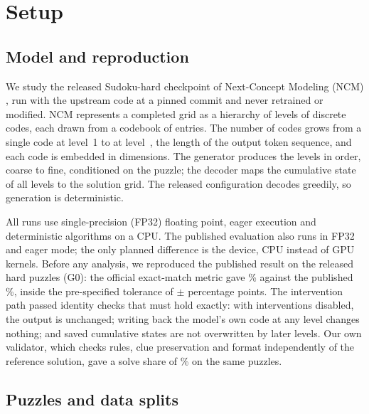 \section{Setup}
\label{sec:setup}

\subsection{Model and reproduction}
\label{sec:setup-model}

We study the released Sudoku-hard checkpoint of Next-Concept Modeling (NCM) \citep{kumbong2026ncm}, run with the upstream code at a pinned commit and never retrained or modified. NCM represents a completed grid as a hierarchy of  levels of discrete codes, each drawn from a codebook of  entries. The number of codes grows from a single code at level~1 to  at level~, the length of the output token sequence, and each code is embedded in  dimensions. The generator produces the levels in order, coarse to fine, conditioned on the puzzle; the decoder maps the cumulative state of all levels to the solution grid. The released configuration decodes greedily, so generation is deterministic.

All runs use single-precision (FP32) floating point, eager execution and deterministic algorithms on a CPU. The published evaluation also runs in FP32 and eager mode; the only planned difference is the device, CPU instead of GPU kernels. Before any analysis, we reproduced the published result on the  released hard puzzles (G0): the official exact-match metric gave \% against the published \%, inside the pre-specified tolerance of $\pm$ percentage points. The intervention path passed identity checks that must hold exactly: with interventions disabled, the output is unchanged; writing back the model's own code at any level changes nothing; and saved cumulative states are not overwritten by later levels. Our own validator, which checks rules, clue preservation and format independently of the reference solution, gave a solve share of \% on the same puzzles.

\subsection{Puzzles and data splits}
\label{sec:setup-data}

